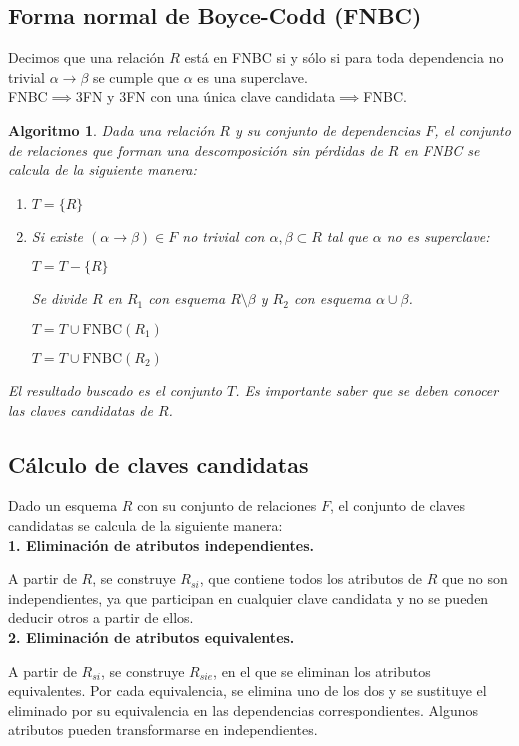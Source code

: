 \documentclass[12pt,a4paper]{article}
\theoremstyle{ejemplo}
\theoremstyle{algoritmo}
\newtheorem*{alg}{Algoritmo} %
\begin{document}
\subsection*{Forma normal de Boyce-Codd (FNBC)}
Decimos que una relación $R$ está en FNBC si y sólo si para toda dependencia no
trivial $\alpha\to\beta$ se cumple que $\alpha$ es una superclave.
\\

FNBC$\implies$3FN y 3FN con una única clave candidata$\implies$FNBC.

\begin{alg}
Dada una relación $R$ y su conjunto de dependencias $F$, el conjunto de 
relaciones que forman una descomposición sin pérdidas de $R$ en FNBC se calcula 
de la siguiente manera:
\begin{enumerate}[noitemsep]
	\item $T=\{R\}$
	\item Si existe $(\alpha\to\beta)\in F$ no trivial con $\alpha,\beta\subset 
	R$ tal que $\alpha$ no es superclave:

	\quad\quad $T=T-\{R\}$
	
	\quad\quad Se divide $R$ en $R_1$ con esquema $R\setminus\beta$ y $R_2$ con
	esquema $\alpha\cup\beta$.
	
	\quad\quad $T=T\cup\text{FNBC}(R_1)$
	
	\quad\quad $T=T\cup\text{FNBC}(R_2)$
	
\end{enumerate}
El resultado buscado es el conjunto $T$. Es importante saber que se deben 
conocer las claves candidatas de $R$.
\end{alg}
\newpage
\subsection*{Cálculo de claves candidatas}
Dado un esquema $R$ con su conjunto de relaciones $F$, el conjunto de claves
candidatas se calcula de la siguiente manera:
\\

\textbf{1. Eliminación de atributos independientes.}

A partir de $R$, se construye $R_{si}$, que contiene todos los atributos de $R$
que no son independientes, ya que participan en cualquier clave candidata y no
se pueden deducir otros a partir de ellos.
\\

\textbf{2. Eliminación de atributos equivalentes.}

A partir de $R_{si}$, se construye $R_{sie}$, en el que se eliminan los 
atributos equivalentes. Por cada equivalencia, se elimina uno de los dos y se
sustituye el eliminado por su equivalencia en las dependencias correspondientes.
Algunos atributos pueden transformarse en independientes.
\\
\end{document}
